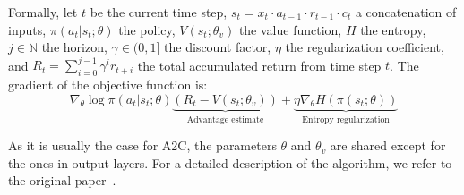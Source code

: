 Formally, let $t$ be the current time step, $s_t=x_t \cdot a_{t-1} \cdot r_{t-1} \cdot c_t$ a concatenation of inputs, $\pi(a_t|s_t; \theta)$ the policy, $V(s_t; \theta_v)$ the value function, $H$ the entropy, $j \in \mathbb{N}$ the horizon, $\gamma \in (0, 1]$ the discount factor, $\eta$ the regularization coefficient, and $R_t = \sum_{i=0}^{j-1} \gamma^i r_{t+i}$ the total accumulated return from time step $t$. The gradient of the objective function is:
\begin{equation}
    \nabla_{\theta} \log \pi(a_t|s_t;\theta) \underbrace{(R_t - V(s_t; \theta_v))}_\textrm{Advantage estimate} + \underbrace{\eta \nabla_{\theta}H(\pi(s_t; \theta))}_\textrm{Entropy regularization}
\end{equation}\label{eq:methodology:rl:poa:gradient}

As it is usually the case for A2C, the parameters $\theta$ and $\theta_v$ are shared except for the ones in output layers. For a detailed description of the algorithm, we refer to the original paper~\citep{A2C}.
